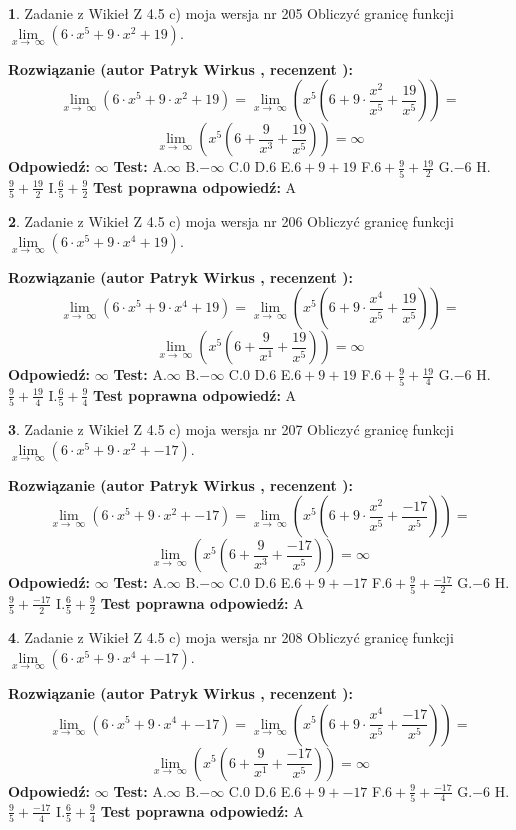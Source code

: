 \documentclass[12pt, a4paper]{article}
\theoremstyle{definition} %
\newtheorem{zad}{}
\newcommand{\zadStart}[1]{\begin{zad}#1\newline}
\newcommand{\zadStop}{\end{zad}}
\newcommand{\rozwStart}[2]{\noindent \textbf{Rozwiązanie (autor #1 , recenzent #2): }\newline}
\newcommand{\rozwStop}{\newline}
\newcommand{\odpStart}{\noindent \textbf{Odpowiedź:}\newline}
\newcommand{\odpStop}{\newline}
\newcommand{\testStart}{\noindent \textbf{Test:}\newline}
\newcommand{\testStop}{\newline}
\newcommand{\kluczStart}{\noindent \textbf{Test poprawna odpowiedź:}\newline}
\newcommand{\kluczStop}{\newline}
\begin{document}
\zadStart{Zadanie z Wikieł Z 4.5 c) moja wersja nr 205}
Obliczyć granicę funkcji  $\lim\limits_{x\to\ \infty}(6 \cdot x^{5}+9 \cdot x^{2}+19)$.
\zadStop
\rozwStart{Patryk Wirkus}{}
$$\lim\limits_{x\to\ \infty}(6 \cdot x^{5}+9 \cdot x^{2}+19) = \lim\limits_{x\to\ \infty}(x^{5}(6 +9 \cdot \frac{x^{2}}{x^{5}}+\frac{19}{x^{5}})) =$$ $$\lim\limits_{x\to\ \infty}(x^{5}(6 +\frac{9}{x^{3}}+\frac{19}{x^{5}})) =\infty$$
\rozwStop
\odpStart
$\infty$
\odpStop
\testStart
A.$\infty$ B.$-\infty$ C.$0$ D.$6$ E.$6 + 9 + 19$
F.$6+\frac{9}{5}+\frac{19}{2}$ G.$-6$
H.$\frac{9}{5}+\frac{19}{2}$
I.$\frac{6}{5}+\frac{9}{2}$
\testStop
\kluczStart
A
\kluczStop



\zadStart{Zadanie z Wikieł Z 4.5 c) moja wersja nr 206}
Obliczyć granicę funkcji  $\lim\limits_{x\to\ \infty}(6 \cdot x^{5}+9 \cdot x^{4}+19)$.
\zadStop
\rozwStart{Patryk Wirkus}{}
$$\lim\limits_{x\to\ \infty}(6 \cdot x^{5}+9 \cdot x^{4}+19) = \lim\limits_{x\to\ \infty}(x^{5}(6 +9 \cdot \frac{x^{4}}{x^{5}}+\frac{19}{x^{5}})) =$$ $$\lim\limits_{x\to\ \infty}(x^{5}(6 +\frac{9}{x^{1}}+\frac{19}{x^{5}})) =\infty$$
\rozwStop
\odpStart
$\infty$
\odpStop
\testStart
A.$\infty$ B.$-\infty$ C.$0$ D.$6$ E.$6 + 9 + 19$
F.$6+\frac{9}{5}+\frac{19}{4}$ G.$-6$
H.$\frac{9}{5}+\frac{19}{4}$
I.$\frac{6}{5}+\frac{9}{4}$
\testStop
\kluczStart
A
\kluczStop



\zadStart{Zadanie z Wikieł Z 4.5 c) moja wersja nr 207}
Obliczyć granicę funkcji  $\lim\limits_{x\to\ \infty}(6 \cdot x^{5}+9 \cdot x^{2}+-17)$.
\zadStop
\rozwStart{Patryk Wirkus}{}
$$\lim\limits_{x\to\ \infty}(6 \cdot x^{5}+9 \cdot x^{2}+-17) = \lim\limits_{x\to\ \infty}(x^{5}(6 +9 \cdot \frac{x^{2}}{x^{5}}+\frac{-17}{x^{5}})) =$$ $$\lim\limits_{x\to\ \infty}(x^{5}(6 +\frac{9}{x^{3}}+\frac{-17}{x^{5}})) =\infty$$
\rozwStop
\odpStart
$\infty$
\odpStop
\testStart
A.$\infty$ B.$-\infty$ C.$0$ D.$6$ E.$6 + 9 + -17$
F.$6+\frac{9}{5}+\frac{-17}{2}$ G.$-6$
H.$\frac{9}{5}+\frac{-17}{2}$
I.$\frac{6}{5}+\frac{9}{2}$
\testStop
\kluczStart
A
\kluczStop



\zadStart{Zadanie z Wikieł Z 4.5 c) moja wersja nr 208}
Obliczyć granicę funkcji  $\lim\limits_{x\to\ \infty}(6 \cdot x^{5}+9 \cdot x^{4}+-17)$.
\zadStop
\rozwStart{Patryk Wirkus}{}
$$\lim\limits_{x\to\ \infty}(6 \cdot x^{5}+9 \cdot x^{4}+-17) = \lim\limits_{x\to\ \infty}(x^{5}(6 +9 \cdot \frac{x^{4}}{x^{5}}+\frac{-17}{x^{5}})) =$$ $$\lim\limits_{x\to\ \infty}(x^{5}(6 +\frac{9}{x^{1}}+\frac{-17}{x^{5}})) =\infty$$
\rozwStop
\odpStart
$\infty$
\odpStop
\testStart
A.$\infty$ B.$-\infty$ C.$0$ D.$6$ E.$6 + 9 + -17$
F.$6+\frac{9}{5}+\frac{-17}{4}$ G.$-6$
H.$\frac{9}{5}+\frac{-17}{4}$
I.$\frac{6}{5}+\frac{9}{4}$
\testStop
\kluczStart
A
\kluczStop
\end{document}
